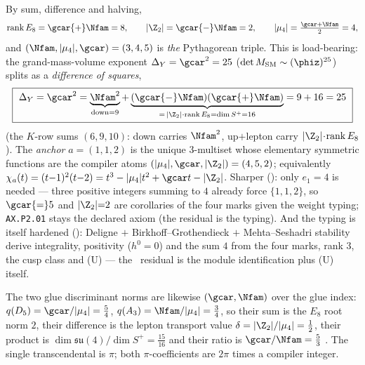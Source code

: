 \begin{keybox}
By sum, difference and halving,
\[
  \operatorname{rank}E_8=\gcar{+}\Nfam=8,\qquad |\Z_2|=\gcar{-}\Nfam=2,\qquad |\mu_4|=\tfrac{\gcar+\Nfam}{2}=4,
\]
and $(\Nfam,|\mu_4|,\gcar)=(3,4,5)$ is \emph{the} Pythagorean triple. This is load-bearing: the
grand-mass-volume exponent $\Delta_Y=\gcar^2=25$ ($\det M_{\mathrm{SM}}\sim(\phiz)^{25}$) splits as a
\emph{difference of squares},
\[
  \boxed{\ \Delta_Y=\gcar^2=\underbrace{\Nfam^2}_{\text{down}=9}
  +\underbrace{(\gcar{-}\Nfam)(\gcar{+}\Nfam)}_{=\,|\Z_2|\cdot\operatorname{rank}E_8=\dim S^+=16}
  =9+16=25\ }
\]
(the $K$-row sums $(6,9,10)$: down carries $\Nfam^2$, up$+$lepton carry $|\Z_2|\!\cdot\!\operatorname{rank}E_8$).
The \emph{anchor} $a=(1,1,2)$ is the unique $3$-multiset whose elementary symmetric functions are the
compiler atoms $(|\mu_4|,\gcar,|\Z_2|)=(4,5,2)$; equivalently $\chi_a(t)=(t{-}1)^2(t{-}2)=t^3-|\mu_4|t^2+\gcar t-|\Z_2|$.
Sharper (): only $e_1{=}4$ is needed --- three positive integers
summing to $4$ already force $\{1,1,2\}$, so $\gcar{=}5$ and $|\Z_2|{=}2$ are corollaries of the four
marks given the weight typing; \texttt{AX.P2.01} stays the declared axiom (the residual is the typing).
And the typing is itself hardened (): Deligne $+$
Birkhoff--Grothendieck $+$ Mehta--Seshadri stability derive integrality, positivity ($h^0{=}0$) and the
sum $4$ from the four marks, rank $3$, the cusp class and (U) --- the \mC\ residual is the module
identification plus (U) itself.
\end{keybox}

The two glue discriminant norms are likewise $(\gcar,\Nfam)$ over the glue index: $q(D_5)=\gcar/|\mu_4|=\tfrac54$,
$q(A_3)=\Nfam/|\mu_4|=\tfrac34$, so their sum is the $E_8$ root norm $2$, their difference is the lepton
transport value $\delta=|\Z_2|/|\mu_4|=\tfrac12$, their product is $\dim\mathfrak{su}(4)/\dim S^+=\tfrac{15}{16}$
and their ratio is $\gcar/\Nfam=\tfrac53$ . The single transcendental is
$\pi$; both $\pi$-coefficients are $2\pi$ times a compiler integer.

